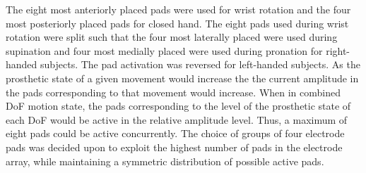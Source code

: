The eight most anteriorly placed pads were used for wrist rotation and the four most posteriorly placed pads for closed hand. The eight pads used during wrist rotation were split such that the four most laterally placed were used during supination and four most medially placed were used during pronation for right-handed subjects. The pad activation was reversed for left-handed subjects. As the prosthetic state of a given movement would increase the the current amplitude in the pads corresponding to that movement would increase. When in combined DoF motion state, the pads corresponding to the level of the prosthetic state of each DoF would be active in the relative amplitude level. Thus, a maximum of eight pads could be active concurrently. The choice of groups of four electrode pads was decided upon to exploit the highest number of pads in the electrode array, while maintaining a symmetric distribution of possible active pads.



